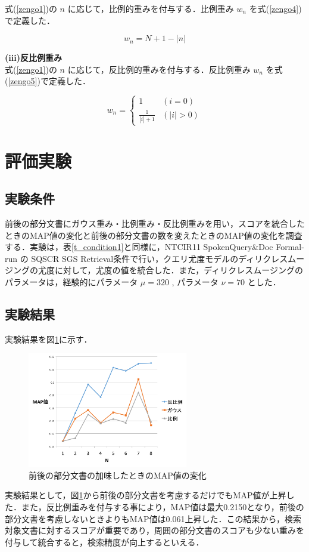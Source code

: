 式(\ref{zengo1})の $n$ に応じて，比例的重みを付与する．比例重み $w_n$ を式(\ref{zengo4})で定義した．

\begin{equation}
    w_n = N+1-|n|
    \label{zengo4}
\end{equation}

{\bf(iii)反比例重み} \\

式(\ref{zengo1})の $n$ に応じて，反比例的重みを付与する．反比例重み $w_n$ を式(\ref{zengo5})で定義した．

\begin{equation}
    w_n = 
    \begin{cases} 
        1 & (i = 0)\\ 
        \frac{1}{|i|+1} & (|i| > 0)
    \end{cases} 
    \label{zengo5}
\end{equation}

\section{評価実験}
\subsection{実験条件}

前後の部分文書にガウス重み・比例重み・反比例重みを用い，スコアを統合したときのMAP値の変化と前後の部分文書の数を変えたときのMAP値の変化を調査する．実験は，表\ref{t_condition1}と同様に，NTCIR11 SpokenQuery\&Doc Formal-run の SQSCR SGS Retrieval条件で行い，クエリ尤度モデルのディリクレスムージングの尤度に対して，尤度の値を統合した．また，ディリクレスムージングのパラメータは，経験的にパラメータ $\mu = 320$ , パラメータ $\nu = 70$ とした． 

\subsection{実験結果}
実験結果を図\ref{web_result1}に示す．

\begin{figure}[htbp]
    \centering
    \includegraphics[width=7cm]{./image/slide2_3.png}
    \caption{前後の部分文書の加味したときのMAP値の変化}
    \label{web_result1}
\end{figure}


実験結果として，図\ref{web_result1}から前後の部分文書を考慮するだけでもMAP値が上昇した．また，反比例重みを付与する事により，MAP値は最大0.2150となり，前後の部分文書を考慮しないときよりもMAP値は0.061上昇した．この結果から，検索対象文書に対するスコアが重要であり，周囲の部分文書のスコアも少ない重みを付与して統合すると，検索精度が向上するといえる．

